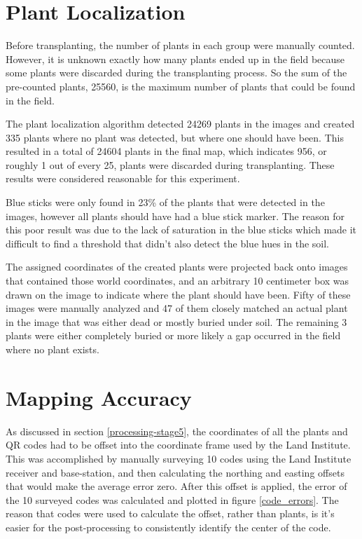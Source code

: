 \section{Plant Localization}
\label{section:plant_localization}

Before transplanting, the number of plants in each group were manually counted. However, it is unknown exactly how many plants ended up in the field because some plants were discarded during the transplanting process.  So the sum of the pre-counted plants, 25560, is the maximum number of plants that could be found in the field.  

The plant localization algorithm detected 24269 plants in the images and created 335 plants where no plant was detected, but where one should have been.  This resulted in a total of 24604 plants in the final map, which indicates 956, or roughly 1 out of every 25, plants were discarded during transplanting.  These results were considered reasonable for this experiment. 

Blue sticks were only found in 23\% of the plants that were detected in the images, however all plants should have had a blue stick marker.  The reason for this poor result was due to the lack of saturation in the blue sticks which made it difficult to find a threshold that didn't also detect the blue hues in the soil.  

The assigned coordinates of the created plants were projected back onto images that contained those world coordinates, and an arbitrary 10 centimeter box was drawn on the image to indicate where the plant should have been.  Fifty of these images were manually analyzed and 47 of them closely matched an actual plant in the image that was either dead or mostly buried under soil.  The remaining 3 plants were either completely buried or more likely a gap occurred in the field where no plant exists.  

\section{Mapping Accuracy}

As discussed in section \ref{processing-stage5}, the coordinates of all the plants and QR codes had to be offset into the coordinate frame used by the Land Institute.  This was accomplished by manually surveying 10 codes using the Land Institute receiver and base-station, and then calculating the northing and easting offsets that would make the average error zero.  After this offset is applied, the error of the 10 surveyed codes was calculated and plotted in figure \ref{code_errors}.  The reason that codes were used to calculate the offset, rather than plants, is it's easier for the post-processing to consistently identify the center of the code. 

